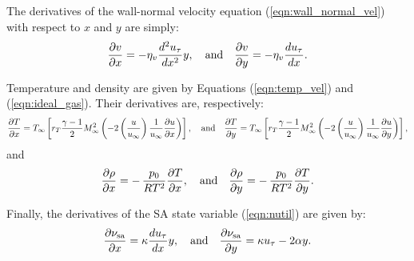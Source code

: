 
The derivatives of  the wall-normal velocity equation (\ref{eqn:wall_normal_vel}) with respect to $x$ and $y$ are simply:
\begin{align*}
\frac{\partial v}{\partial x} = - \eta_v \frac{d ^2 u_{\tau}}{d x^2} y, \quad \mbox{and} \quad
\frac{\partial v}{\partial y} = - \eta_v \frac{d u_{\tau}}{d x}.
\end{align*}
%

 Temperature and density are given by Equations (\ref{eqn:temp_vel}) and (\ref{eqn:ideal_gas}). Their derivatives are, respectively:
\begin{gather*}
\frac{\partial T}{\partial x} = T_{\infty} \left[  r_T \frac{\gamma - 1}{2} M_{\infty}^2 \left(  - 2 \left(\frac{u}{u_\infty}\right) \frac{1}{u_\infty} \frac{\partial u}{\partial x} \right) \right],\quad \mbox{and} \quad
\frac{\partial T}{\partial y} = T_{\infty} \left[  r_T \frac{\gamma - 1}{2} M_{\infty}^2 \left(  - 2 \left(\frac{u}{u_\infty}\right) \frac{1}{u_\infty} \frac{\partial u}{\partial y} \right) \right],
\end{gather*}
and
\begin{gather*}
\frac{\partial \rho}{\partial x} = - \, \frac{p_0}{R T^2} \frac{\partial T}{\partial x}, \quad \mbox{and} \quad
\frac{\partial \rho}{\partial y} = - \, \frac{p_0}{R T^2} \frac{\partial T}{\partial y}. 
\end{gather*}
%

Finally, the derivatives of the SA state variable (\ref{eqn:nutil}) are given by:
\begin{gather*}
\frac{\partial \nu_{\mathrm{sa}}}{\partial x} = \kappa \frac{d u_{\tau}}{d x} y ,  \quad \mbox{and} \quad
\frac{\partial \nu_{\mathrm{sa}}}{\partial y} = \kappa u_{\tau} - 2 \alpha y.
\end{gather*}
